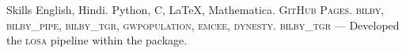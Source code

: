 
\begin{rubric}{Skills}
\entry*[Languages]
	English, Hindi.
	Python, C, \LaTeX, Mathematica.
	\textsc{GitHub Pages}.
\entry*[Packages]
	\textsc{bilby, bilby\_pipe, bilby\_tgr, gwpopulation, emcee, dynesty}.
	\textsc{bilby\_tgr} --- Developed the \textsc{losa} pipeline within the package.
    
\end{rubric}
